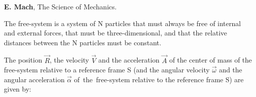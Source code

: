 \documentclass[10pt]{article}
\begin{document}
\par \bigskip\smallskip \noindent \textbf{E. Mach}, The Science of Mechanics.

\newpage

\par {}

\par {}\hypertarget{p3a1}{}

\par \bigskip \noindent The free-system is a system of N particles that must always be free of internal and external forces, that must be three-dimensional, and that the relative distances between the N particles must be constant.

\par \bigskip \noindent The position ${\vec{\mathit{R}}}$, the velocity ${\vec{\mathit{V}}}$ and the acceleration ${\vec{\mathit{A}}}$ of the center of mass of the free-system relative to a reference frame S (and the angular velocity ${\vec{\omega}}$ and the angular acceleration ${\vec{\alpha}}$ \hbox {of the free-system} relative to the reference frame S) are given by:
\end{document}

